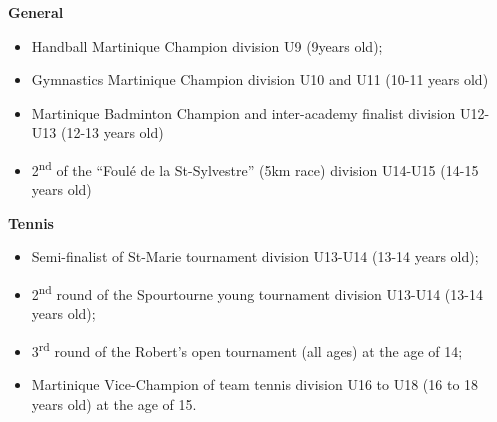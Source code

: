 \documentclass[margin]{res}
\begin{document}
\begin{resume}
  {\bf General}
  \begin{itemize} \itemsep -2pt %
  \item Handball Martinique Champion division U9 (9years old);
  \item Gymnastics Martinique Champion division U10 and U11 (10-11 years old)
  \item Martinique Badminton Champion and inter-academy finalist division U12-U13 (12-13 years old)
  \item 2\textsuperscript{nd} of the ``Foul\'e de la St-Sylvestre'' (5km race) division U14-U15 (14-15 years old)
  \end{itemize}

  {\bf Tennis}
  \begin{itemize} \itemsep -2pt %

  \item Semi-finalist of St-Marie tournament division U13-U14 (13-14 years old);
  \item 2\textsuperscript{nd} round of the Spourtourne young tournament division U13-U14 (13-14 years old);
  \item 3\textsuperscript{rd} round of the Robert’s open tournament (all ages) at the age of 14;
  \item Martinique Vice-Champion of team tennis division U16 to U18 (16 to 18 years old) at the age of 15.
  \end{itemize}


\end{resume} 
\end{document}
